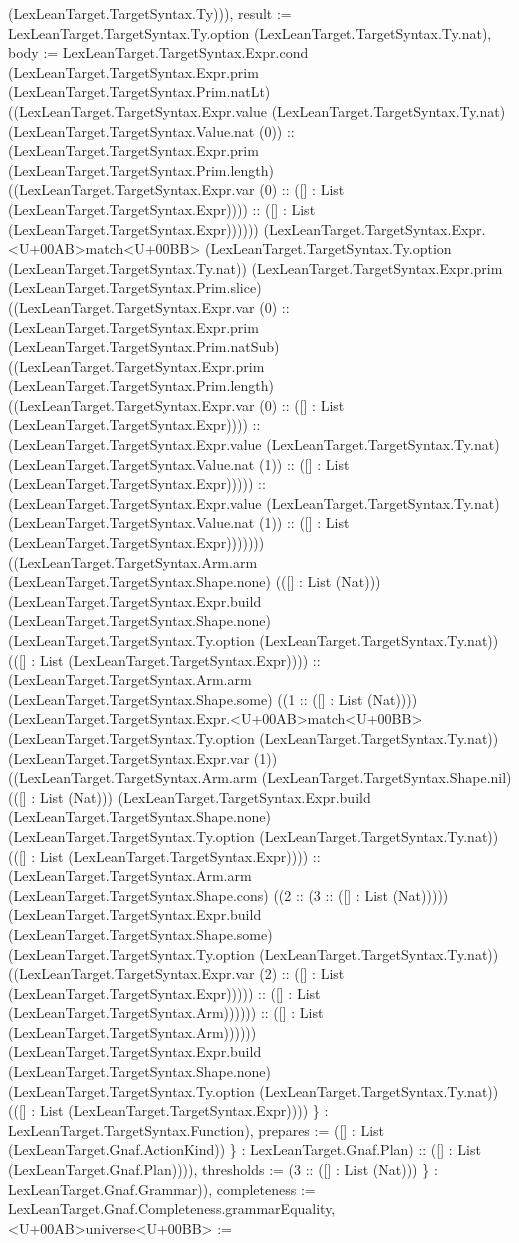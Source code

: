 \documentclass[11pt]{article}
\begin{document}
(LexLeanTarget.TargetSyntax.Ty))), result := LexLeanTarget.TargetSyntax.Ty.option (LexLeanTarget.TargetSyntax.Ty.nat), body := LexLeanTarget.TargetSyntax.Expr.cond (LexLeanTarget.TargetSyntax.Expr.prim (LexLeanTarget.TargetSyntax.Prim.natLt) ((LexLeanTarget.TargetSyntax.Expr.value (LexLeanTarget.TargetSyntax.Ty.nat) (LexLeanTarget.TargetSyntax.Value.nat (0)) :: (LexLeanTarget.TargetSyntax.Expr.prim (LexLeanTarget.TargetSyntax.Prim.length) ((LexLeanTarget.TargetSyntax.Expr.var (0) :: ([] : List (LexLeanTarget.TargetSyntax.Expr)))) :: ([] : List (LexLeanTarget.TargetSyntax.Expr)))))) (LexLeanTarget.TargetSyntax.Expr.<U+00AB>match<U+00BB> (LexLeanTarget.TargetSyntax.Ty.option (LexLeanTarget.TargetSyntax.Ty.nat)) (LexLeanTarget.TargetSyntax.Expr.prim (LexLeanTarget.TargetSyntax.Prim.slice) ((LexLeanTarget.TargetSyntax.Expr.var (0) :: (LexLeanTarget.TargetSyntax.Expr.prim (LexLeanTarget.TargetSyntax.Prim.natSub) ((LexLeanTarget.TargetSyntax.Expr.prim (LexLeanTarget.TargetSyntax.Prim.length) ((LexLeanTarget.TargetSyntax.Expr.var (0) :: ([] : List (LexLeanTarget.TargetSyntax.Expr)))) :: (LexLeanTarget.TargetSyntax.Expr.value (LexLeanTarget.TargetSyntax.Ty.nat) (LexLeanTarget.TargetSyntax.Value.nat (1)) :: ([] : List (LexLeanTarget.TargetSyntax.Expr))))) :: (LexLeanTarget.TargetSyntax.Expr.value (LexLeanTarget.TargetSyntax.Ty.nat) (LexLeanTarget.TargetSyntax.Value.nat (1)) :: ([] : List (LexLeanTarget.TargetSyntax.Expr))))))) ((LexLeanTarget.TargetSyntax.Arm.arm (LexLeanTarget.TargetSyntax.Shape.none) (([] : List (Nat))) (LexLeanTarget.TargetSyntax.Expr.build (LexLeanTarget.TargetSyntax.Shape.none) (LexLeanTarget.TargetSyntax.Ty.option (LexLeanTarget.TargetSyntax.Ty.nat)) (([] : List (LexLeanTarget.TargetSyntax.Expr)))) :: (LexLeanTarget.TargetSyntax.Arm.arm (LexLeanTarget.TargetSyntax.Shape.some) ((1 :: ([] : List (Nat)))) (LexLeanTarget.TargetSyntax.Expr.<U+00AB>match<U+00BB> (LexLeanTarget.TargetSyntax.Ty.option (LexLeanTarget.TargetSyntax.Ty.nat)) (LexLeanTarget.TargetSyntax.Expr.var (1)) ((LexLeanTarget.TargetSyntax.Arm.arm (LexLeanTarget.TargetSyntax.Shape.nil) (([] : List (Nat))) (LexLeanTarget.TargetSyntax.Expr.build (LexLeanTarget.TargetSyntax.Shape.none) (LexLeanTarget.TargetSyntax.Ty.option (LexLeanTarget.TargetSyntax.Ty.nat)) (([] : List (LexLeanTarget.TargetSyntax.Expr)))) :: (LexLeanTarget.TargetSyntax.Arm.arm (LexLeanTarget.TargetSyntax.Shape.cons) ((2 :: (3 :: ([] : List (Nat))))) (LexLeanTarget.TargetSyntax.Expr.build (LexLeanTarget.TargetSyntax.Shape.some) (LexLeanTarget.TargetSyntax.Ty.option (LexLeanTarget.TargetSyntax.Ty.nat)) ((LexLeanTarget.TargetSyntax.Expr.var (2) :: ([] : List (LexLeanTarget.TargetSyntax.Expr))))) :: ([] : List (LexLeanTarget.TargetSyntax.Arm)))))) :: ([] : List (LexLeanTarget.TargetSyntax.Arm)))))) (LexLeanTarget.TargetSyntax.Expr.build (LexLeanTarget.TargetSyntax.Shape.none) (LexLeanTarget.TargetSyntax.Ty.option (LexLeanTarget.TargetSyntax.Ty.nat)) (([] : List (LexLeanTarget.TargetSyntax.Expr)))) \} : LexLeanTarget.TargetSyntax.Function), prepares := ([] : List (LexLeanTarget.Gnaf.ActionKind)) \} : LexLeanTarget.Gnaf.Plan) :: ([] : List (LexLeanTarget.Gnaf.Plan)))), thresholds := (3 :: ([] : List (Nat))) \} : LexLeanTarget.Gnaf.Grammar)), completeness := LexLeanTarget.Gnaf.Completeness.grammarEquality, <U+00AB>universe<U+00BB> := 
\end{document}

